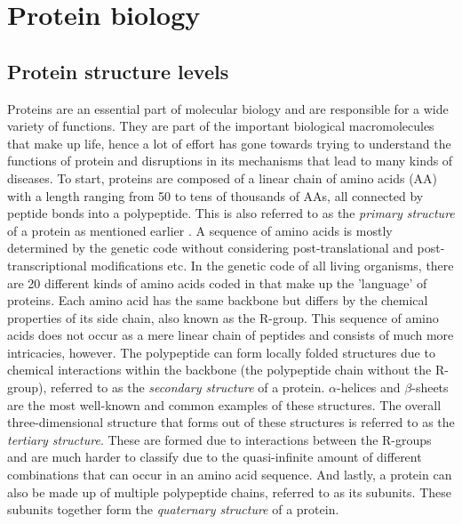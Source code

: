 \section{Protein biology}
\subsection{Protein structure levels}
Proteins are an essential part of molecular biology and are responsible for a wide variety of functions. They are part of the important biological macromolecules that make up life, hence a lot of effort has gone towards trying to understand the functions of protein and disruptions in its mechanisms that lead to many kinds of diseases. To start, proteins are composed of a linear chain of amino acids (AA) with a length ranging from 50 to tens of thousands of AAs, all connected by peptide bonds into a polypeptide. This is also referred to as the \textit{primary structure} of a protein as mentioned earlier \cite{primstruct}. A sequence of amino acids is mostly determined by the genetic code without considering post-translational and post-transcriptional modifications etc. In the genetic code of all living organisms, there are 20 different kinds of amino acids coded in that make up the 'language' of proteins. Each amino acid has the same backbone but differs by the chemical properties of its side chain, also known as the R-group. This sequence of amino acids does not occur as a mere linear chain of peptides and consists of much more intricacies, however. The polypeptide can form locally folded structures due to chemical interactions within the backbone (the polypeptide chain without the R-group), referred to as the \textit{secondary structure} of a protein. $\alpha$-helices and $\beta$-sheets are the most well-known and common examples of these structures. The overall three-dimensional structure that forms out of these structures is referred to as the \textit{tertiary structure}. These are formed due to interactions between the R-groups and are much harder to classify due to the quasi-infinite amount of different combinations that can occur in an amino acid sequence. And lastly, a protein can also be made up of multiple polypeptide chains, referred to as its subunits. These subunits together form the \textit{quaternary structure} of a protein.

